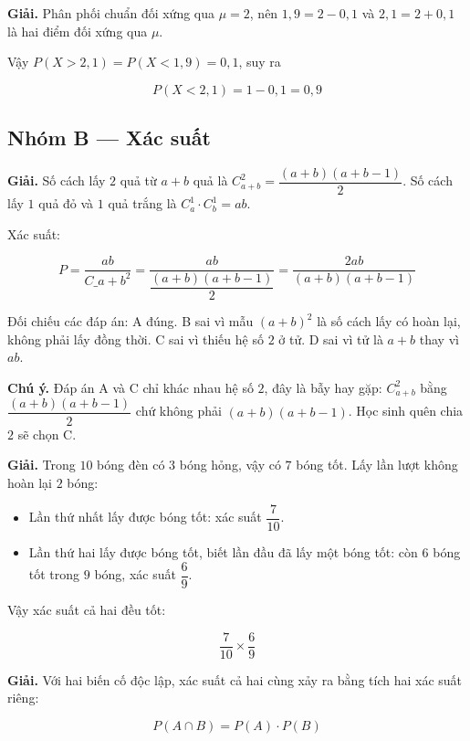 \documentclass[11pt, a4paper]{article}
\begin{document}
\begin{dapan}[13 — Đáp án D]
\textbf{Giải.} Phân phối chuẩn đối xứng qua $\mu = 2$, nên $1{,}9 = 2 - 0{,}1$ và $2{,}1 = 2 + 0{,}1$ là hai điểm đối xứng qua $\mu$.

Vậy $P(X > 2{,}1) = P(X < 1{,}9) = 0{,}1$, suy ra

$$P(X < 2{,}1) = 1 - 0{,}1 = 0{,}9$$
\end{dapan}

\subsection*{Nhóm B — Xác suất}

\begin{dapan}[14 — Đáp án A]
\textbf{Giải.} Số cách lấy $2$ quả từ $a + b$ quả là $C_{a+b}^2 = \dfrac{(a+b)(a+b-1)}{2}$. Số cách lấy $1$ quả đỏ và $1$ quả trắng là $C_a^1 \cdot C_b^1 = ab$.

Xác suất:

$$P = \frac{ab}{C\_{a+b}^2} = \frac{ab}{\dfrac{(a+b)(a+b-1)}{2}} = \frac{2ab}{(a+b)(a+b-1)}$$

Đối chiếu các đáp án: A đúng. B sai vì mẫu $(a+b)^2$ là số cách lấy có hoàn lại, không phải lấy đồng thời. C sai vì thiếu hệ số $2$ ở tử. D sai vì tử là $a+b$ thay vì $ab$.

\textbf{Chú ý.} Đáp án A và C chỉ khác nhau hệ số $2$, đây là bẫy hay gặp: $C_{a+b}^2$ bằng $\dfrac{(a+b)(a+b-1)}{2}$ chứ không phải $(a+b)(a+b-1)$. Học sinh quên chia $2$ sẽ chọn C.
\end{dapan}

\begin{dapan}[15 — Đáp án A]
\textbf{Giải.} Trong $10$ bóng đèn có $3$ bóng hỏng, vậy có $7$ bóng tốt. Lấy lần lượt không hoàn lại $2$ bóng:

\begin{itemize}[leftmargin=1.4em, itemsep=2pt]
\item Lần thứ nhất lấy được bóng tốt: xác suất $\dfrac{7}{10}$.
\item Lần thứ hai lấy được bóng tốt, biết lần đầu đã lấy một bóng tốt: còn $6$ bóng tốt trong $9$ bóng, xác suất $\dfrac{6}{9}$.
\end{itemize}


Vậy xác suất cả hai đều tốt:

$$\frac{7}{10} \times \frac{6}{9}$$
\end{dapan}

\begin{dapan}[16 — Đáp án B]
\textbf{Giải.} Với hai biến cố độc lập, xác suất cả hai cùng xảy ra bằng tích hai xác suất riêng:

$$P(A \cap B) = P(A) \cdot P(B)$$
\end{dapan}
\end{document}
